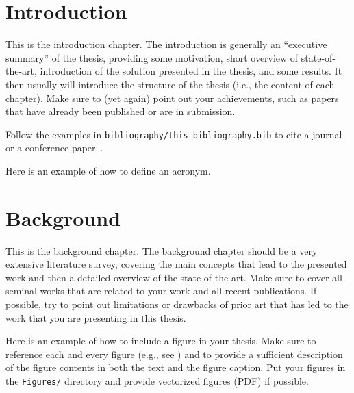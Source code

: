 \documentclass[a4paper,12pt,twoside,openany]{book}
\newcommand{\doctype}{phd-thesis}
\begin{document}
    \ifthenelse{\equal{\doctype}{phd-proposal}}{
        
        \clearpage
    }



\mainmatter
\chapter{Introduction}
\label{sec_intro}
\color{teal}
    This is the introduction chapter. The introduction is generally an ``executive summary'' of the thesis, providing some motivation, short overview of state-of-the-art, introduction of the solution presented in the thesis, and some results. It then usually will introduce the structure of the thesis (i.e., the content of each chapter). Make sure to (yet again) point out your achievements, such as papers that have already been published or are in submission.

\color{cyan}
    Follow the examples in \texttt{bibliography/this\_bibliography.bib} to cite a journal~\cite{nameYEARtitleJOURNAL} or a conference paper~\cite{nameYEARtitleCONFERENCE}.
    
    Here is an \gls{example} of how to define an acronym.
\color{black}


\chapter{Background}
\label{sec_background}
\color{teal}
    This is the background chapter. The background chapter should be a very extensive literature survey, covering the main concepts that lead to the presented work and then a detailed overview of the state-of-the-art. Make sure to cover all seminal works that are related to your work and all recent publications. If possible, try to point out limitations or drawbacks of prior art that has led to the work that you are presenting in this thesis.

\color{cyan}
    Here is an example of how to include a figure in your thesis. Make sure to reference each and every figure (e.g., see ) and to provide a sufficient description of the figure contents in both the text and the figure caption. Put your figures in the \texttt{Figures/} directory and provide vectorized figures (PDF) if possible. 
\end{document}
